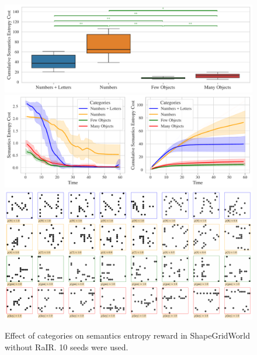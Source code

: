 \begin{figure}[h]
    \centering
    \includegraphics[width=\textwidth]{images/categories_boxplot_sgw_norair_cropped.pdf}
    \vspace{12pt}
    \includegraphics[width=\textwidth]{images/categories_comparison_sgw_norair_cropped.pdf}
    \vspace{12pt}
    \includegraphics[width=\textwidth]{images/categories_samples_sgw_norair_cropped.pdf}
    \caption[Effect of categories on semantics entropy reward in ShapeGridWorld without RaIR.]{Effect of categories on semantics entropy reward in ShapeGridWorld without RaIR. 10 seeds were used.}
    \label{fig:categories-sgw-norair}
\end{figure}

